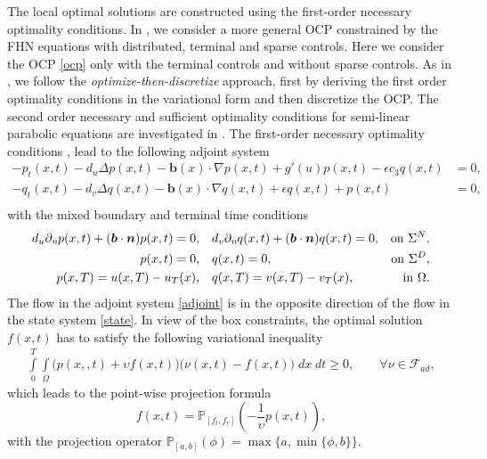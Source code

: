 \documentclass[preprint,12pt]{elsarticle}
\begin{document}
The local optimal solutions are constructed using the first-order necessary optimality conditions. In \cite{Uzunca17}, we consider a more general OCP constrained by the FHN equations with distributed, terminal and sparse controls. Here we consider the OCP \eqref{ocp} only with the terminal controls and without sparse controls.
As in \cite{Uzunca17}, we follow the {\em optimize-then-discretize} approach, first by deriving the first order optimality conditions in the variational form and then discretize the OCP. The  second order necessary and sufficient optimality conditions for semi-linear parabolic equations are investigated in \cite{Casas13, Troltzsch10}.
The first-order necessary optimality conditions \cite[Chapter 1]{Troltzsch10},  lead to the following adjoint system
\begin{equation}\label{adjoint}
\begin{aligned}
-p_t(x,t) - d_u\Delta p(x,t) - \bm{b}(x)\cdot\nabla p(x,t)  + g'(u)p(x,t) - \epsilon c_3q(x,t) &= 0,  \\
-q_t(x,t) - d_v\Delta q(x,t) - \bm{b}(x)\cdot\nabla q(x,t) + \epsilon q(x,t) + p(x,t) &= 0,\\
\end{aligned}
\end{equation}
with the mixed boundary and terminal time conditions
\begin{equation*}
\begin{aligned}
d_u \partial_{\emph{n}} p(x,t) + (\bm{b} \cdot \bm{n}) p(x,t) = 0, \quad & d_v \partial_{\emph{n}} q(x,t) + (\bm{b} \cdot \bm{n})q(x,t)  =  0, & \text{on  } \Sigma^N, \\
p(x,t) =  0, \quad & q(x,t)  =  0, &  \text{on  } \Sigma^D,  \\
p(x,T) =   u(x, T)-u_T(x), \quad & q(x,T)  = v(x, T)-v_T(x), &  \text{in  } \Omega.
\end{aligned}
\end{equation*}
The flow in the adjoint system \eqref{adjoint} is in the opposite direction of the flow in the state system \eqref{state}.
In view of the box constraints, the optimal solution $f(x,t)$ has to satisfy the following variational inequality
\begin{align*}
\int \limits_{0}^{T} \int \limits_{\Omega} \big( p(x,,t) + \upsilon f(x,t)  \big) \big(\nu(x,t) -f(x,t)\big) \;dx \;dt \geq 0, \qquad \forall \nu \in \mathcal{F}_{ad},
\end{align*}
which leads to the point-wise projection formula
\begin{equation*}
f(x,t) = \mathbb{P}_{[f_l,f_r]}\left( -\frac{1}{\upsilon}p(x,t) \right),
\end{equation*}
with the projection operator $\mathbb{P}_{[a,b]}(\phi)= \max \{a,\min \{\phi,b\}\}$.
\end{document}
